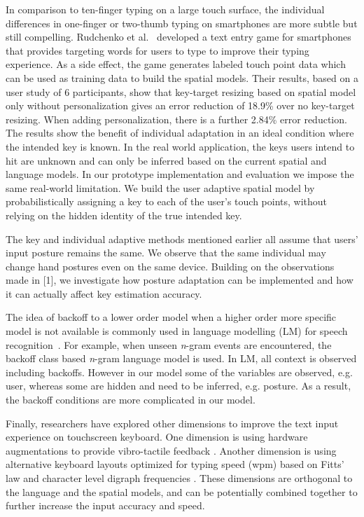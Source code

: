 \documentclass{sigchi}
\begin{document}
In comparison to ten-finger typing on a large touch surface, the individual 
differences in one-finger or two-thumb typing on smartphones are more subtle but
still compelling. Rudchenko et al.~\cite{Rudchenko:2011} developed a text entry 
game for smartphones that provides targeting words for users to type to improve 
their typing experience. As a side effect, the game generates labeled touch 
point data which can be used as training data to build the spatial models.
Their results, based on a user study of 6 participants, show that key-target
resizing based on spatial model only without personalization gives an error reduction of 18.9\% over no key-target resizing. 
When adding personalization, there is a further 2.84\% error reduction.
The results show the benefit of individual adaptation in an ideal condition
where the intended key is known. In the real world application, the keys users 
intend to hit are unknown and can only be inferred based on the current spatial 
and language models. In our prototype implementation and evaluation we impose 
the same real-world limitation. We build the user adaptive spatial model by 
probabilistically assigning a key to each of the user's touch points, without
relying on the hidden identity of the true intended key.

The key and individual adaptive methods mentioned earlier all assume that users' input posture
remains the same. We observe that the same individual may change hand postures even on the same device. Building on the observations made in [1], we investigate how posture adaptation can be implemented and how it can actually affect key estimation accuracy.

The idea of backoff to a lower order model when a higher order more specific model is not available is commonly used in language modelling (LM) for speech recognition~\cite{Katz:1987, Zitouni:2007}. For example, when unseen \textit{n}-gram events are encountered, the backoff class based \textit{n}-gram language model is used.  In LM,  all context is observed including backoffs. However in our model some of the variables are observed, e.g. user, whereas some are hidden and need to be inferred, e.g. posture. As a result, the backoff conditions are more complicated in our model.

Finally, researchers have explored other dimensions to improve the 
text input experience on touchscreen keyboard. One dimension is using hardware
augmentations to provide vibro-tactile feedback \cite{Brewster:2007, Hoggan:2008}. 
Another dimension is using alternative keyboard layouts optimized for typing speed (wpm)
based on Fitts' law and character level digraph frequencies \cite{Zhai:2000, MacKenzie:1999}.
These dimensions are orthogonal to the language and the spatial models, and can be potentially 
combined together to further increase the input accuracy and speed.
\end{document}
